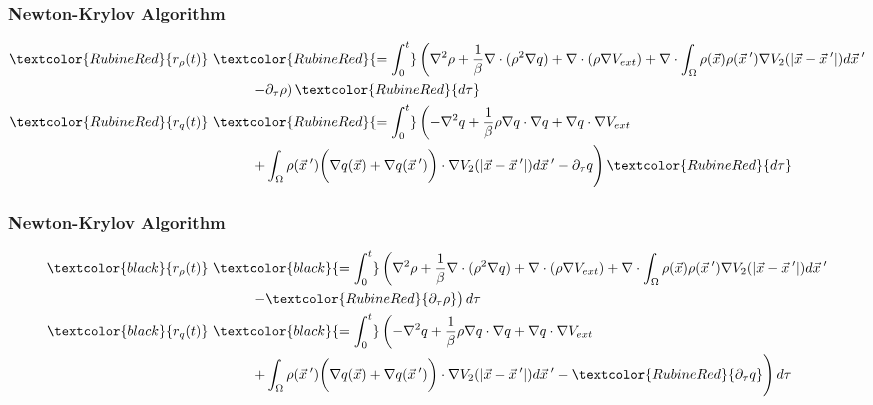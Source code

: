 \documentclass[aspectratio=169,xcolor=dvipsnames]{beamer}
\begin{document}
\begin{frame}
	\frametitle{Newton-Krylov Algorithm}
	\begin{align*}
	\textcolor{RubineRed}{r_\rho(t)} & \ \textcolor{RubineRed}{ = \int_0^t} \left(\nabla^2 \rho + \frac{1}{\beta}\nabla \cdot (\rho^2 \nabla q) + \nabla \cdot \left(\rho \nabla V_{ext}\right)
	+ \nabla \cdot \int_\Omega \rho(\vec{x}) \rho(\vec{x}\hspace{0.2em}') \nabla V_2(|\vec{x}-\vec{x}\hspace{0.2em}'|)d\vec{x}\hspace{0.2em}' \right.\\
	& \qquad \quad \left. - \partial_\tau \rho \right) \textcolor{RubineRed}{d \tau}\\
	\textcolor{RubineRed}{r_q(t) }& \ \textcolor{RubineRed}{ = \int_0^t} \left(-\nabla^2 q + \frac{1}{\beta}\rho\nabla q \cdot   \nabla q  + \nabla q \cdot \nabla V_{ext} \right.\\
    &\qquad \quad	\left. + \int_\Omega \rho(\vec{x}\hspace{0.2em}') \bigg(\nabla q(\vec{x}) + \nabla q(\vec{x}\hspace{0.2em}')\bigg)\cdot  \nabla V_2(|\vec{x}-\vec{x}\hspace{0.2em}'|)d\vec{x}\hspace{0.2em}'  - \partial_\tau q \right) \textcolor{RubineRed}{d \tau}
\end{align*}

\end{frame}

\begin{frame}
	\frametitle{Newton-Krylov Algorithm}
	\begin{align*}
	\textcolor{black}{r_\rho(t) }&  \ \textcolor{black}{= \int_0^t} \left(\nabla^2 \rho + \frac{1}{\beta}\nabla \cdot (\rho^2 \nabla q) + \nabla \cdot \left(\rho \nabla V_{ext}\right)
	+ \nabla \cdot \int_\Omega \rho(\vec{x}) \rho(\vec{x}\hspace{0.2em}') \nabla V_2(|\vec{x}-\vec{x}\hspace{0.2em}'|)d\vec{x}\hspace{0.2em}' \right.\\
	& \qquad \quad \left. -\textcolor{RubineRed}{ \partial_\tau \rho }\right) d \tau\\
	\textcolor{black}{r_q(t)} &  \ \textcolor{black}{= \int_0^t} \left(-\nabla^2 q + \frac{1}{\beta}\rho\nabla q \cdot   \nabla q  + \nabla q \cdot \nabla V_{ext} \right.\\
	&\qquad \quad	\left. + \int_\Omega \rho(\vec{x}\hspace{0.2em}') \bigg(\nabla q(\vec{x}) + \nabla q(\vec{x}\hspace{0.2em}')\bigg)\cdot  \nabla V_2(|\vec{x}-\vec{x}\hspace{0.2em}'|)d\vec{x}\hspace{0.2em}'- \textcolor{RubineRed}{  \partial_\tau q} \right) d \tau
\end{align*}

	
\end{frame}
\end{document}

